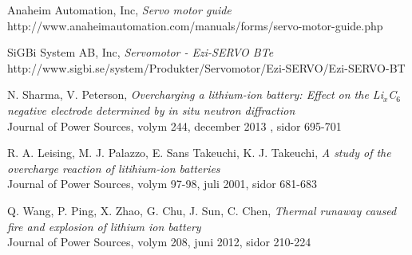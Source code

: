 \documentclass[a4paper,12pt]{article}
\begin{document}
\begin{thebibliography}{9}
 Anaheim Automation, Inc, \emph{Servo motor guide}\\
 http://www.anaheimautomation.com/manuals/forms/servo-motor-guide.php

 SiGBi System AB, Inc, \emph{Servomotor - Ezi-SERVO BTe}\\
http://www.sigbi.se/system/Produkter/Servomotor/Ezi-SERVO/Ezi-SERVO-BT

 N. Sharma, V. Peterson, \emph{Overcharging a lithium-ion battery: Effect on the Li$_{x}$C$_{6}$ negative electrode determined by in situ neutron diffraction}
\\ Journal of Power Sources, volym 244, december 2013 , sidor 695-701

 R. A. Leising, M. J. Palazzo, E. Sans Takeuchi, K. J. Takeuchi, \emph{A study of the overcharge reaction of litihium-ion batteries}
\\ Journal of Power Sources, volym 97-98, juli 2001, sidor 681-683

 Q. Wang, P. Ping, X. Zhao, G. Chu, J. Sun, C. Chen, \emph{Thermal runaway caused fire and explosion of lithium ion battery}
\\ Journal of Power Sources, volym 208, juni 2012, sidor 210-224

\end{thebibliography}
\end{document}
